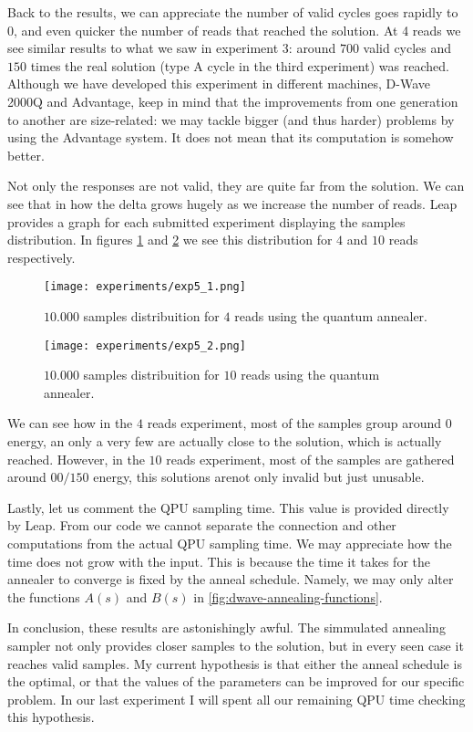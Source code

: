 Back to the results, we can appreciate the number of valid cycles goes rapidly to $0$, and even quicker the number of reads that reached the solution. At 4 reads we see similar results to what we saw in experiment 3: around $700$ valid cycles and $150$ times the real solution (type A cycle in the third experiment) was reached. Although we have developed this experiment in different machines, D-Wave 2000Q and Advantage, keep in mind that the improvements from one generation to another are size-related: we may tackle bigger (and thus harder) problems by using the Advantage system. It does not mean that its computation is somehow better.

Not only the responses are not valid, they are quite far from the solution. We can see that in how the delta grows hugely as we increase the number of reads. Leap provides a graph for each submitted experiment displaying the samples distribution. In figures \ref{fig:exp5_1} and \ref{fig:exp5_2} we see this distribution for $4$ and $10$ reads respectively. 

\begin{figure}[H]
	\texttt{[image: experiments/exp5\_1.png]}
	\centering
	\caption{$10.000$ samples distribuition for $4$ reads using the quantum annealer.}
	\label{fig:exp5_1}
\end{figure}

\begin{figure}[H]
	\texttt{[image: experiments/exp5\_2.png]}
	\centering
	\caption{$10.000$ samples distribuition for $10$ reads using the quantum annealer.}
	\label{fig:exp5_2}
\end{figure}

We can see how in the $4$ reads experiment, most of the samples group around $0$ energy, an only a very few are actually close to the solution, which is actually reached. However, in the $10$ reads experiment, most of the samples are gathered around $00/150$ energy, this solutions arenot only invalid but just unusable.

Lastly, let us comment the QPU sampling time. This value is provided directly by Leap. From our code we cannot separate the connection and other computations from the actual QPU sampling time. We may appreciate how the time does not grow with the input. This is because the time it takes for the annealer to converge is fixed by the anneal schedule. Namely, we may only alter the functions $A(s)$ and $B(s)$ in \ref{fig:dwave-annealing-functions}.

In conclusion, these results are astonishingly awful. The simmulated annealing sampler not only provides closer samples to the solution, but in every seen case it reaches valid samples. My current hypothesis is that either the anneal schedule is the optimal, or that the values of the parameters can be improved for our specific problem. In our last experiment I will spent all our remaining QPU time checking this hypothesis.


